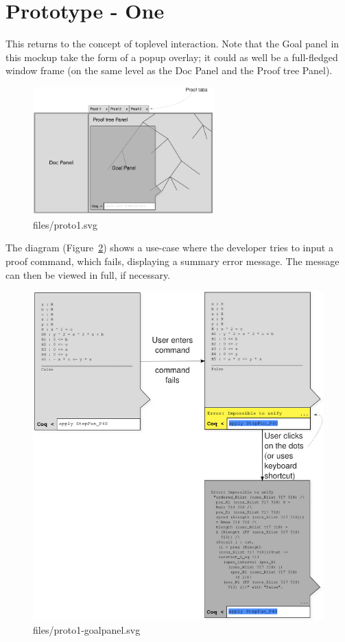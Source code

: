 \documentclass[11pt,a4paper]{article}
\begin{document}
\section*{Prototype - One}
This returns to the concept of toplevel interaction. Note that the
Goal panel in this mockup take the form of a popup overlay; it could
as well be a full-fledged window frame (on the same level as the Doc
Panel and the Proof tree Panel).

\begin{figure}[ht!]
  \centering
  \includegraphics[width=7cm]{files/proto1.png}
  \caption{files/proto1.svg}
  \label{fig:3}
\end{figure}


The diagram (Figure~\ref{fig:4}) shows a use-case where the developer tries to input a proof
command, which fails, displaying a summary error message. The message
can then be viewed in full, if necessary.  

\begin{figure}[ht!]
  \centering
  \includegraphics[width=12cm]{files/proto1-goalpanel.png}
  \caption{files/proto1-goalpanel.svg}
  \label{fig:4}
\end{figure}
\end{document}
